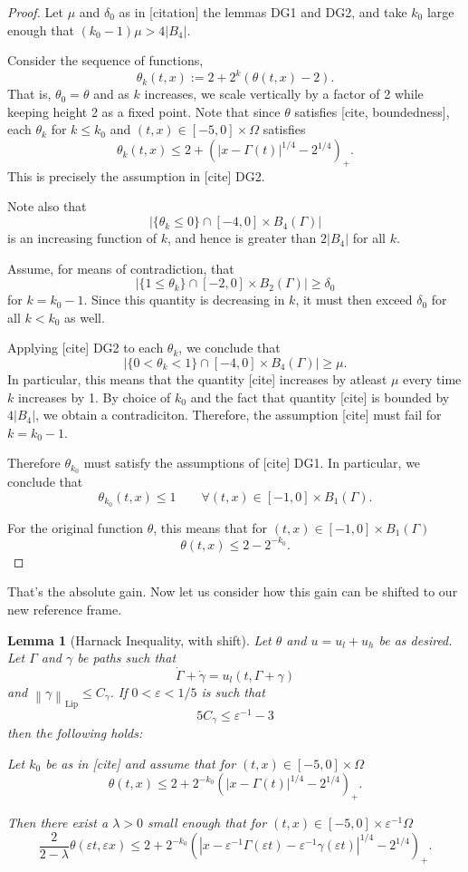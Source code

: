 \documentclass[11pt]{amsart}
\newtheorem{lemma}[theorem]{Lemma}
\theoremstyle{remark}
\newcommand{\eps}{\varepsilon}
\newcommand{\norm}[1]{\left\lVert#1\right\rVert}
\newcommand{\paren}[1]{\left( #1 \right)}
\newcommand{\abs}[1]{\left\lvert #1 \right\rvert}
\newcommand{\Lip}{\text{Lip}}
\newcommand{\n}{^{-1}}
\newcommand{\ulow}{u_l}
\newcommand{\uhigh}{u_h}
\begin{document}
\begin{proof}
Let $\mu$ and $\delta_0$ as in [citation] the lemmas DG1 and DG2, and take $k_0$ large enough that $(k_0-1) \mu > 4 |B_4|$.  

Consider the sequence of functions,
\[ \theta_k(t,x) := 2 + 2^k (\theta(t,x) - 2). \]
That is, $\theta_0 = \theta$ and as $k$ increases, we scale vertically by a factor of 2 while keeping height 2 as a fixed point.  Note that since $\theta$ satisfies [cite, boundedness], each $\theta_k$ for $k \leq k_0$ and $(t,x) \in [-5,0] \times \Omega$ satisfies
\[ \theta_k(t,x) \leq 2 + \paren{|x-\Gamma(t)|^{1/4}-2^{1/4}}_+. \]
This is precisely the assumption in [cite] DG2.  

Note also that
\[ \abs{\{\theta_k \leq 0\} \cap [-4,0]\times B_4(\Gamma)} \]
is an increasing function of $k$, and hence is greater than $2|B_4|$ for all $k$.  

Assume, for means of contradiction, that
\[ \abs{\{1 \leq \theta_k \} \cap [-2,0]\times B_2(\Gamma)} \geq \delta_0 \]
for $k = k_0-1$.  Since this quantity is decreasing in $k$, it must then exceed $\delta_0$ for all $ k < k_0$ as well.  

Applying [cite] DG2 to each $\theta_k$, we conclude that 
\[ \abs{\{0 < \theta_k < 1\} \cap [-4,0]\times B_4(\Gamma)} \geq \mu. \]
In particular, this means that the quantity [cite] increases by atleast $\mu$ every time $k$ increases by 1. By choice of $k_0$ and the fact that quantity [cite] is bounded by $4|B_4|$, we obtain a contradiciton.  Therefore, the assumption [cite] must fail for $k = k_0-1$.  

Therefore $\theta_{k_0}$ must satisfy the assumptions of [cite] DG1.  In particular, we conclude that
\[ \theta_{k_0}(t,x) \leq 1 \qquad \forall (t,x) \in [-1,0]\times B_1(\Gamma). \]

For the original function $\theta$, this means that for $(t,x) \in [-1,0] \times B_1(\Gamma)$
\[ \theta(t,x) \leq 2 - 2^{-k_0}. \]
\end{proof}

That's the absolute gain.  Now let us consider how this gain can be shifted to our new reference frame.  

\begin{lemma}[Harnack Inequality, with shift]
Let $\theta$ and $u = \ulow + \uhigh$ be as desired.  Let $\Gamma$ and $\gamma$ be paths such that
\[ \dot{\Gamma} + \dot{\gamma} = \ulow(t,\Gamma+\gamma) \]
and $\norm{\gamma}_\Lip \leq C_\gamma$.  If $0 < \eps < 1/5$ is such that
\[ 5 C_\gamma \leq \eps\n - 3 \]
then the following holds:

Let $k_0$ be as in [cite] and assume that for $(t,x) \in [-5,0]\times \Omega$
\[ \theta(t,x) \leq 2 + 2^{-k_0} \paren{|x-\Gamma(t)|^{1/4}-2^{1/4}}_+. \]

Then there exist a $\lambda > 0$ small enough that for $(t,x) \in [-5,0]\times \eps\n \Omega$
\[ \frac{2}{2-\lambda} \theta(\eps t, \eps x) \leq 2 + 2^{-k_0} \paren{|x-\eps\n\Gamma(\eps t)-\eps\n\gamma(\eps t)|^{1/4}-2^{1/4}}_+. \]
\end{lemma}
\end{document}
